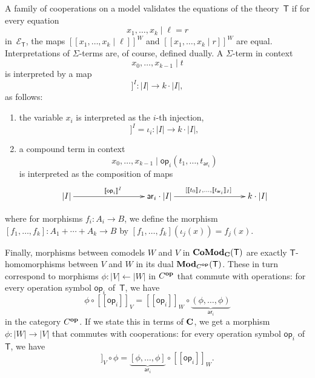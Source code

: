 \documentclass{amsart}
\newcommand{\theory}[1]{\mathsf{#1}} %
\newcommand{\equations}[1]{\mathcal{E}_{\theory{#1}}} %
\newcommand{\ModC}[2]{\text{\textbf{Mod}}_{\category{#1}}(\theory{#2})} %
\newcommand{\ComodC}[2]{\text{\textbf{CoMod}}_{\category{#1}}(\theory{#2})} %
\newcommand{\opcat}[1]{\ensuremath{#1^{\text{\textbf{op}}}}}
\newcommand{\from}{\leftarrow}
\newcommand{\category}[1]{\text{\textbf{#1}}} %
\newcommand{\op}[1]{\mathsf{op}_{#1}} %
\newcommand{\arity}[1]{\mathsf{ar}_{#1}} %
\newcommand{\sem}[1]{[\![#1]\!]} %
\begin{document}
A family of cooperations on a model validates the equations of the theory~$\theory{T}$ if for every equation
%
\begin{equation*}
  x_1, \ldots, x_k \mid \ell = r
\end{equation*}
%
in~$\equations{T}$, the maps $\sem{x_1, \ldots, x_k \mid \ell}^W$ and $\sem{x_1, \ldots, x_k \mid r}^W$ are equal. Interpretations of $\Sigma$-terms are, of course, defined dually. A $\Sigma$-term in context
%
\begin{equation*}
  x_0, \ldots, x_{k-1} \mid t
\end{equation*}
%
is interpreted by a map
%
\begin{equation*}
  \sem{x_0, \ldots, x_{k-1} \mid t}^I : |I| \to k \cdot |I|,
\end{equation*}
%
as follows:
%
\begin{enumerate}
\item the variable $x_i$ is interpreted as the $i$-th injection,
  \begin{equation*}
    \sem{x_0, \ldots, x_{k-1} \mid  x_i}^I = \iota_i : |I| \to k \cdot |I|,
  \end{equation*}
\item a compound term in context
  \begin{equation*}
    x_0, \ldots, x_{k-1} \mid \op{i}(t_1, \ldots, t_{\arity{i}})
  \end{equation*}
  is interpreted as the composition of maps
  \begin{equation*}
    \xymatrix@+6em{
      {|I|} \ar[r]^{\sem{\op{i}}^I}
      &
      {{\arity{i}} \cdot |I|} \ar[r]^{[\sem{t_0}_I, \ldots, \sem{t_{\arity{i}}}_I]}
      &
      {k \cdot |I|}
    }
  \end{equation*}
\end{enumerate}
%
where for morphisms $f_i \colon A_i \to B$, we define the morphism $[f_1, \dots, f_k] \colon A_1 + \cdots + A_k \to B$ by $[f_1, \dots, f_k](\iota_j(x)) = f_j(x)$.

Finally, morphisms between comodels $W$ and $V$ in $\ComodC{C}{T}$ are exactly $\theory{T}$-homomorphisms between $V$ and $W$ in its dual $\ModC{\opcat{C}}{T}$. These in turn correspond to morphisms $\phi \colon |V| \from |W|$ in $\opcat{C}$ that commute with operations: for every operation symbol $\op{i}$ of~$\theory{T}$, we have
%
\begin{equation*}
  \phi \circ \sem{\op{i}}_V = \sem{\op{i}}_W \circ \underbrace{(\phi, \ldots, \phi)}_{\arity{i}}
\end{equation*}
in the category $\opcat{C}$. If we state this in terms of $\category{C}$, we get a morphism $\phi \colon |W| \to |V|$ that commutes with cooperations: for every operation symbol $\op{i}$ of~$\theory{T}$, we have
%
\begin{equation*}
  \sem{\op{i}}_V \circ \phi = \underbrace{[\phi, \ldots, \phi]}_{\arity{i}} \circ \sem{\op{i}}_W.
\end{equation*}
\end{document}
